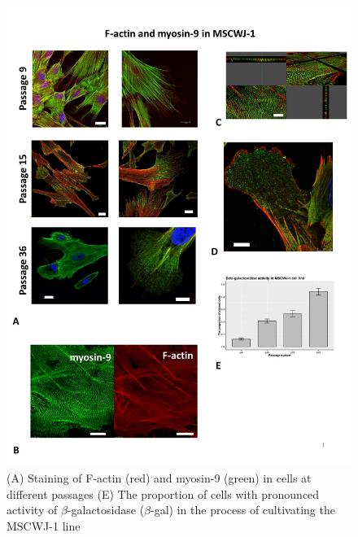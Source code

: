 \documentclass[english,authoryear]{elsarticle}
\begin{document}
\begin{figure}[hbt!]
  \label{m9-actin-bgal}
\centering
\includegraphics[width=0.9\linewidth]{fig_m9-actin-bgal.jpg}
\caption{(A) Staining of F-actin (red) and myosin-9 (green) in cells at different passages (E) The proportion of cells with pronounced activity of $\beta$-galactosidase ($\beta$-gal) in the process of cultivating the MSCWJ-1 line}
\end{figure}
\end{document}

